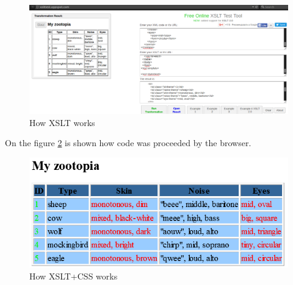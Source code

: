 \documentclass{article}
\begin{document}
\begin{figure}[h!]
    \centering
    \includegraphics[width=16cm]{xslt_xml_valid.png}
    \caption{How XSLT works}
    \label{fig:xslt_xml}
\end{figure}

On the figure \ref{fig:xhtml} is shown how code was proceeded by the browser.

\begin{figure}[h!]
    \centering
    \includegraphics[width=16cm]{xhtml.png}
    \caption{How XSLT+CSS works}
    \label{fig:xhtml}
\end{figure}
\end{document}
